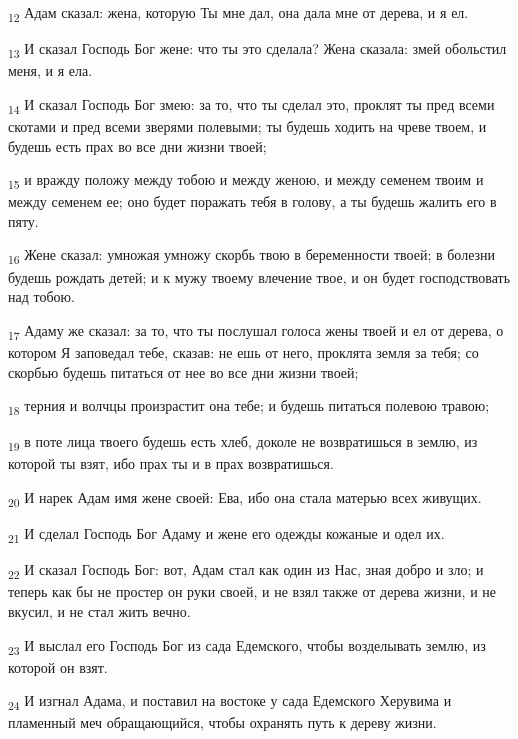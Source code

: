 \begin{tcolorbox}
\textsubscript{12} Адам сказал: жена, которую Ты мне дал, она дала мне от дерева, и я ел.
\end{tcolorbox}
\begin{tcolorbox}
\textsubscript{13} И сказал Господь Бог жене: что ты это сделала? Жена сказала: змей обольстил меня, и я ела.
\end{tcolorbox}
\begin{tcolorbox}
\textsubscript{14} И сказал Господь Бог змею: за то, что ты сделал это, проклят ты пред всеми скотами и пред всеми зверями полевыми; ты будешь ходить на чреве твоем, и будешь есть прах во все дни жизни твоей;
\end{tcolorbox}
\begin{tcolorbox}
\textsubscript{15} и вражду положу между тобою и между женою, и между семенем твоим и между семенем ее; оно будет поражать тебя в голову, а ты будешь жалить его в пяту.
\end{tcolorbox}
\begin{tcolorbox}
\textsubscript{16} Жене сказал: умножая умножу скорбь твою в беременности твоей; в болезни будешь рождать детей; и к мужу твоему влечение твое, и он будет господствовать над тобою.
\end{tcolorbox}
\begin{tcolorbox}
\textsubscript{17} Адаму же сказал: за то, что ты послушал голоса жены твоей и ел от дерева, о котором Я заповедал тебе, сказав: не ешь от него, проклята земля за тебя; со скорбью будешь питаться от нее во все дни жизни твоей;
\end{tcolorbox}
\begin{tcolorbox}
\textsubscript{18} терния и волчцы произрастит она тебе; и будешь питаться полевою травою;
\end{tcolorbox}
\begin{tcolorbox}
\textsubscript{19} в поте лица твоего будешь есть хлеб, доколе не возвратишься в землю, из которой ты взят, ибо прах ты и в прах возвратишься.
\end{tcolorbox}
\begin{tcolorbox}
\textsubscript{20} И нарек Адам имя жене своей: Ева, ибо она стала матерью всех живущих.
\end{tcolorbox}
\begin{tcolorbox}
\textsubscript{21} И сделал Господь Бог Адаму и жене его одежды кожаные и одел их.
\end{tcolorbox}
\begin{tcolorbox}
\textsubscript{22} И сказал Господь Бог: вот, Адам стал как один из Нас, зная добро и зло; и теперь как бы не простер он руки своей, и не взял также от дерева жизни, и не вкусил, и не стал жить вечно.
\end{tcolorbox}
\begin{tcolorbox}
\textsubscript{23} И выслал его Господь Бог из сада Едемского, чтобы возделывать землю, из которой он взят.
\end{tcolorbox}
\begin{tcolorbox}
\textsubscript{24} И изгнал Адама, и поставил на востоке у сада Едемского Херувима и пламенный меч обращающийся, чтобы охранять путь к дереву жизни.
\end{tcolorbox}
